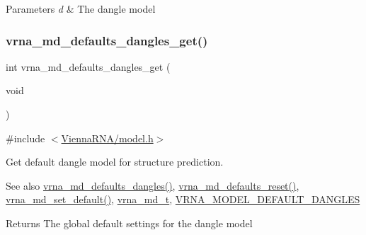 \begin{DoxyParams}{Parameters}
{\em d} & The dangle model \\
\hline
\end{DoxyParams}
\mbox{\label{group__model__details_ga67ca06f95ae133778c79a4493c9817b8}} 
\subsubsection{\texorpdfstring{vrna\+\_\+md\+\_\+defaults\+\_\+dangles\+\_\+get()}{vrna\_md\_defaults\_dangles\_get()}}
{\footnotesize\ttfamily int vrna\+\_\+md\+\_\+defaults\+\_\+dangles\+\_\+get (\begin{DoxyParamCaption}\item[{void}]{ }\end{DoxyParamCaption})}



{\ttfamily \#include $<$\hyperlink{model_8h}{Vienna\+R\+N\+A/model.\+h}$>$}



Get default dangle model for structure prediction. 

\begin{DoxySeeAlso}{See also}
\hyperlink{group__model__details_gac76a5374def8e5e4e644ff6e4cc72dee}{vrna\+\_\+md\+\_\+defaults\+\_\+dangles()}, \hyperlink{group__model__details_ga70834424cf804d149937de89f80ceb45}{vrna\+\_\+md\+\_\+defaults\+\_\+reset()}, \hyperlink{group__model__details_ga8ac6ff84936282436f822644bf841f66}{vrna\+\_\+md\+\_\+set\+\_\+default()}, \hyperlink{group__model__details_ga1f8a10e12a0a1915f2a4eff0b28ea17c}{vrna\+\_\+md\+\_\+t}, \hyperlink{group__model__details_ga2aa7bc2cae774b83a5c468f824c27a42}{V\+R\+N\+A\+\_\+\+M\+O\+D\+E\+L\+\_\+\+D\+E\+F\+A\+U\+L\+T\+\_\+\+D\+A\+N\+G\+L\+ES} 
\end{DoxySeeAlso}
\begin{DoxyReturn}{Returns}
The global default settings for the dangle model 
\end{DoxyReturn}
\mbox{\label{group__model__details_gafff6449a02744add0308e653230c15fc}} 
